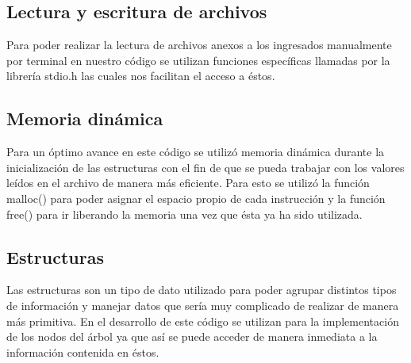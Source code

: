 \subsection{Lectura y escritura de archivos}
\noindent Para poder realizar la lectura de archivos anexos a los ingresados manualmente por terminal en nuestro código se utilizan funciones específicas llamadas por la librería stdio.h las cuales nos facilitan el acceso a éstos.

\subsection{Memoria dinámica}
\noindent Para un óptimo avance en este código se utilizó memoria dinámica durante la inicialización de las estructuras con el fin de que se pueda trabajar con los valores leídos en el archivo de manera más eficiente. Para esto se utilizó la función malloc() para poder asignar el espacio propio de cada instrucción y la función free() para ir liberando la memoria una vez que ésta ya ha sido utilizada.

\subsection{Estructuras}
\noindent Las estructuras son un tipo de dato utilizado para poder agrupar distintos tipos de información y manejar datos que sería muy complicado de realizar de manera más primitiva. En el desarrollo de este código se utilizan para la implementación de los nodos del árbol ya que así se puede acceder de manera inmediata a la información contenida en éstos.
